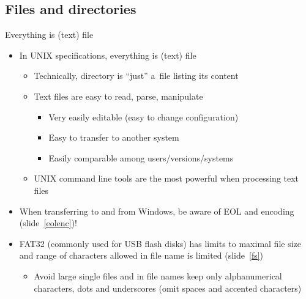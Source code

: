 \documentclass[compress, ucs, xelatex, 11pt, xcolor=svgnames,
  hyperref={
    bookmarks=true,
    unicode=true,
    colorlinks=true,
    pdftitle={Linux, command line and MetaCentrum},
    plainpages=false,
    pdfauthor={Vojtech Zeisek},
    pdfsubject={Course about use of Linux command line, writing shell scripts and using MetaCentrum of CESNET},
    pdfcreator={XeLaTeX},
    pdfkeywords={Linux, GNU, BASH, shell, command line, MetaCentrum},
    linkcolor=DarkRed,
    anchorcolor=DarkBlue,
    citecolor=Indigo,
    filecolor=NavyBlue,
    menucolor=DarkMagenta,
    urlcolor=DarkBlue,
    pdftex},
  url={hyphens, lowtilde} %
  ]{beamer}
\begin{document}
\subsection{Files and directories}

\begin{frame}{Everything is (text) file}
  \begin{itemize}
    \item In UNIX specifications, everything is (text) file
    \begin{itemize}
      \item Technically, directory is ``just'' a~file listing its content
      \item Text files are easy to read, parse, manipulate
      \begin{itemize}
	\item Very easily editable (easy to change configuration)
	\item Easy to transfer to another system
	\item Easily comparable among users/versions/systems
      \end{itemize}
      \item UNIX command line tools are the most powerful when processing text files
    \end{itemize}
    \item When transferring to and from Windows, be aware of EOL and encoding (slide~\ref{eolenc})!
    \item FAT32 (commonly used for USB flash disks) has limits to maximal file size and range of characters allowed in file name is limited (slide~\ref{fs})
    \begin{itemize}
      \item Avoid large single files and in file names keep only alphanumerical characters, dots and underscores (omit spaces and accented characters)
    \end{itemize}
    \end{itemize}
\end{frame}
\end{document}
